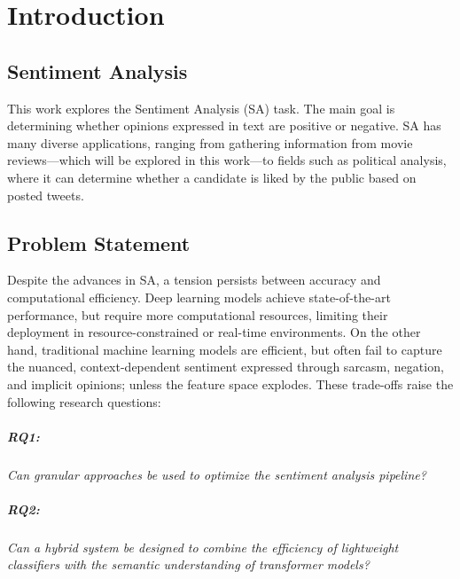 \documentclass[a4paper,twoside,12pt]{book}
\begin{document}
\cleardoublepage

\pagestyle{PageNumbersChapterTitles}


\chapter{Introduction} \label{chap:introduction}
\section{Sentiment Analysis} %

This work explores the Sentiment Analysis (SA) task. The main goal is determining whether opinions expressed in text are positive or negative. SA has many diverse applications, ranging from gathering information from movie reviews---which will be explored in this work---to fields such as political analysis, where it can determine whether a candidate is liked by the public based on posted tweets.

\section{Problem Statement} %

Despite the advances in SA, a tension persists between accuracy and computational efficiency. Deep learning models achieve state-of-the-art performance, but require more computational resources, limiting their deployment in resource-constrained or real-time environments. On the other hand, traditional machine learning models are efficient, but often fail to capture the nuanced, context-dependent sentiment expressed through sarcasm, negation, and implicit opinions; unless the feature space explodes. These trade-offs raise the following research questions:

\paragraph{RQ1:}
\emph{Can granular approaches be used to optimize the sentiment analysis pipeline?}

\paragraph{RQ2:}
\emph{Can a hybrid system be designed to combine the efficiency of lightweight classifiers with the semantic understanding of transformer models?}
\end{document}
